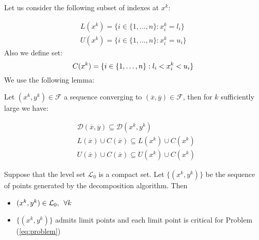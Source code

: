 Let us consider the following subset of indexes at $x^k$:

\begin{equation}\label{eq:indexes}
 \begin{aligned}
   L(x^k) =\{ i \in\{1,\ldots,n \}: x^k_i = l_i\}\\
  U(x^k) =\{i \in\{1,\ldots,n \} : x^k_i = u_i\}
 \end{aligned}
\end{equation}
Also we define set:
\begin{equation}
 C(x^k)=\{ i \in\{1,\ldots,n \}: l_i<x^k_i < u_i\}\\
\end{equation}
We use the following lemma:
\begin{lemma}\label{lem:direction}
 Let ${(x^k,y^k)} \in \mathcal{F}$ a sequence converging to $(\overline{x},\overline{y}) \in \mathcal{F}$, then for $k$ sufficiently large we have:
 
 \begin{subequations}
 \begin{align}
& \mathcal{D}(\overline{x},\overline{y}) \subseteq \mathcal{D}(x^k,y^k)\\
&L(\overline{x})\cup C(\overline{x})  \subseteq L(x^k)\cup C(x^k)\\
&U(\overline{x})\cup C(\overline{x})  \subseteq U(x^k)\cup C(x^k)
\end{align}
 \end{subequations}

\end{lemma}

\begin{proposition}
Suppose that the level set $\mathcal{L}_0$ is a compact set. Let $\{(x^k, y^k)\}$ be the sequence of points generated by the decomposition algorithm. Then
\begin{itemize}
\item $(x^k, y^k) \in \mathcal{L}_0, \enskip \forall k$ 
\item  $\{(x^k, y^k)\}$ admits limit points and each limit point is critical for Problem (\ref{eq:problem})
\end{itemize}
\end{proposition}

